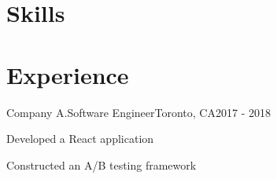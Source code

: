 \documentclass{simple-resume}
\begin{document}
\makeHeader
\section{Skills}
\section{Experience}
\begin{entry}{Company A.}{Software Engineer}{Toronto, CA}{2017 - 2018}
    \begin{entryItems}
        \item Developed a React application
        \item Constructed an A/B testing framework
    \end{entryItems}
\end{entry}
\end{document}

